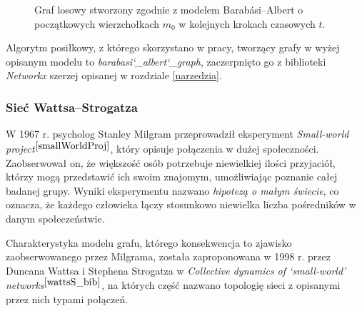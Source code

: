 \documentclass[a4paper, 12pt, twoside, openright]{article}
\begin{document}
\begin{figure}[!p]
		\quad
		
		\caption[]{Graf losowy stworzony zgodnie z modelem Barabási–Albert o początkowych wierzchołkach $m_0$ w kolejnych krokach czasowych $t$.}
		\label{BarabasiImg1}
	\end{figure}
 	
 	
 	Algorytm posiłkowy, z którego skorzystano w pracy, tworzący grafy w wyżej opisanym modelu to \textit{barabasi\char`_albert\char`_graph}, zaczerpnięto go z biblioteki \textit{Networkx} szerzej opisanej w rozdziale \ref{narzedzia}.
	
	
\subsubsection{Sieć Wattsa–Strogatza} \label{WSWS}
\indent\par
	W 1967 r. psycholog Stanley Milgram przeprowadził eksperyment \textit{Small-world project}$^{\cite{smallWorldProj}}$, który opisuje połączenia w dużej społeczności. Zaobserwował on, że większość osób potrzebuje niewielkiej ilości przyjaciół, którzy mogą przedstawić ich swoim znajomym, umożliwiając poznanie całej badanej grupy. Wyniki eksperymentu nazwano \textit{hipotezą o małym świecie}, co oznacza, że każdego człowieka łączy stosunkowo niewielka liczba pośredników w danym społeczeństwie.
	
	Charakterystyka modelu grafu, którego konsekwencja to zjawisko zaobserwowanego przez Milgrama, została zaproponowana w 1998 r. przez Duncana Wattsa i Stephena Strogatza w \textit{Collective dynamics of ‘small-world’ networks}$^{\cite{wattsS_bib}}$, na których część nazwano topologię sieci z opisanymi przez nich typami połączeń. 
	
\end{document}
